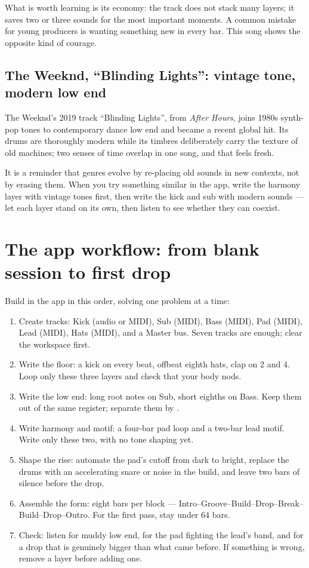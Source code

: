 What is worth learning is its economy: the track does not stack many layers; it saves two or three sounds for the most important moments. A common mistake for young producers is wanting something new in every bar. This song shows the opposite kind of courage.

\subsection{The Weeknd, ``Blinding Lights'': vintage tone, modern low end}
\label{sec:edm-case-weeknd}

The Weeknd's 2019 track ``Blinding Lights'', from \emph{After Hours}, joins 1980s synth-pop tones to contemporary dance low end and became a recent global hit. Its drums are thoroughly modern while its timbres deliberately carry the texture of old machines; two senses of time overlap in one song, and that feels fresh.

It is a reminder that genres evolve by re-placing old sounds in new contexts, not by erasing them. When you try something similar in the app, write the harmony layer with vintage tones first, then write the kick and sub with modern sounds --- let each layer stand on its own, then listen to see whether they can coexist.

\section{The app workflow: from blank session to first drop}
\label{sec:edm-yeban}

Build in the app in this order, solving one problem at a time:

\begin{enumerate}
\item Create tracks: Kick (audio or MIDI), Sub (MIDI), Bass (MIDI), Pad (MIDI), Lead (MIDI), Hats (MIDI), and a Master bus. Seven tracks are enough; clear the workspace first.
\item Write the floor: a kick on every beat, offbeat eighth hats, clap on 2 and 4. Loop only these three layers and check that your body nods.
\item Write the low end: long root notes on Sub, short eighths on Bass. Keep them out of the same register; separate them by .
\item Write harmony and motif: a four-bar pad loop and a two-bar lead motif. Write only these two, with no tone shaping yet.
\item Shape the rise: automate the pad's cutoff from dark to bright, replace the drums with an accelerating snare or noise in the build, and leave two bars of silence before the drop.
\item Assemble the form: eight bars per block --- Intro--Groove--Build--Drop--Break--Build--Drop--Outro. For the first pass, stay under 64 bars.
\item Check: listen for muddy low end, for the pad fighting the lead's band, and for a drop that is genuinely bigger than what came before. If something is wrong, remove a layer before adding one.
\end{enumerate}

